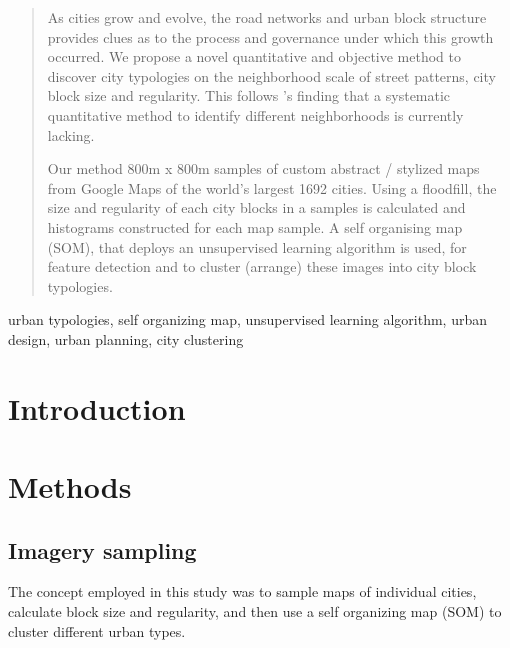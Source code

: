 \documentclass[final,3p,times,authoryear]{elsarticle}
\begin{document}
\begin{frontmatter}
\begin{abstract}
As cities grow and evolve, the road networks and urban block structure provides clues as to the process and governance under which this growth occurred. We propose a novel quantitative and objective method to discover city typologies on the neighborhood scale of street patterns, city block size and regularity. This follows \cite{Louf2014a}'s finding that a systematic quantitative method to identify different neighborhoods is currently lacking. 

Our method 800m x 800m samples of custom abstract / stylized maps from Google Maps of the world's largest 1692 cities. Using a floodfill, the size and regularity of each city blocks in a samples is calculated and histograms constructed for each map sample. A self organising map (SOM), that deploys an unsupervised learning algorithm is used, for feature detection and to cluster (arrange) these images into city block typologies. 


\end{abstract}

\begin{keyword}
urban typologies, self organizing map, unsupervised learning algorithm, urban design, urban planning, city clustering



\end{keyword}

\end{frontmatter}







\section{Introduction}\label{sec:introduction}






\section{Methods}\label{sec:Methods}

\subsection{Imagery sampling}\label{sec:methods2}
The concept employed in this study was to sample maps of individual cities, calculate block size and regularity, and then use a self organizing map (SOM) to cluster different urban types.
\end{document}
